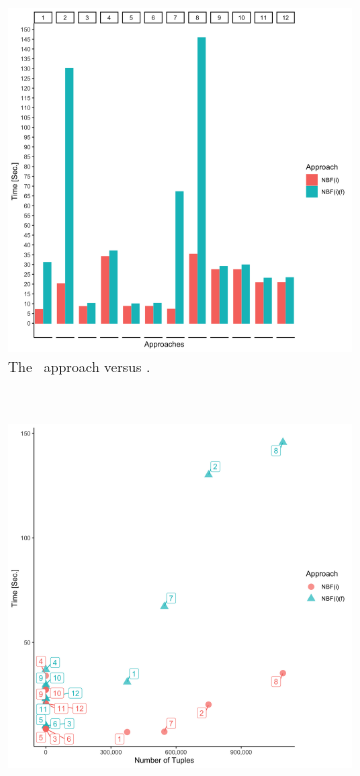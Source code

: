 \begin{figure}[t!]
    \centering
    \begin{subfigure}[t]{0.5\textwidth}
        \centering
        \includegraphics[scale=0.09]{figs/plots/emp-nbfi-comp-f.png}
        \caption[The \nbfi\ approach versus \nbfif]{The \nbfi\ approach versus \nbfif.}
    \end{subfigure}%
    ~ 
    \begin{subfigure}[t]{0.5\textwidth}
        \centering
        \includegraphics[scale=0.09]{figs/plots/emp-nbfi-f-comp-scatter.png}

\end{subfigure}
\end{figure}
